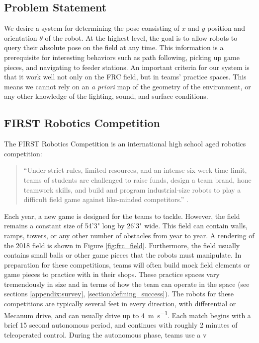 \documentclass{article}
\begin{document}
  \subsection{Problem Statement}

    We desire a system for determining the pose consisting of $x$ and $y$ position and orientation $\theta$ of the robot. At the highest level, the goal is to allow robots to query their absolute pose on the field at any time. This information is a prerequisite for interesting behaviors such as path following, picking up game pieces, and navigating to feeder stations. An important criteria for our system is that it work well not only on the FRC field, but in teams' practice spaces. This means we cannot rely on an \textit{a priori} map of the geometry of the environment, or any other knowledge of the lighting, sound, and surface conditions.

  \subsection{FIRST Robotics Competition} \label{section:frc}

    The FIRST Robotics Competition is an international high school aged robotics competition:
    \begin{quotation}
      ``Under strict rules, limited resources, and an intense six-week time limit, teams of students are challenged to raise funds, design a team brand, hone teamwork skills, and build and program industrial-size robots to play a difficult field game against like-minded competitors.'' \cite{kamen_first_2015}.
    \end{quotation}

    Each year, a new game is designed for the teams to tackle. However, the field remains a constant size of 54'3" long by 26'3" wide. This field can contain walls, ramps, towers, or any other number of obstacles from year to year. A rendering of the 2018 field is shown in Figure \ref{fig:frc_field}. Furthermore, the field usually contains small balls or other game pieces that the robots must manipulate. In preparation for these competitions, teams will often build mock field elements or game pieces to practice with in their shops. These practice spaces vary tremendously in size and in terms of how the team can operate in the space (see sections \ref{appendix:survey}, \ref{section:defining_success}). The robots for these competitions are typically several feet in every direction, with differential or Mecanum drive, and can usually drive up to \SI{4}{\meter\per\second}. Each match begins with a brief 15 second autonomous period, and continues with roughly 2 minutes of teleoperated control. During the autonomous phase, teams use a v
\end{document}

